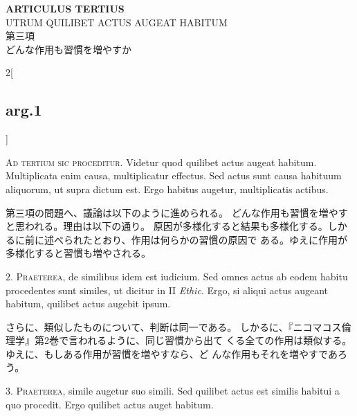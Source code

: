 \documentclass[paper=a4paper,fontsize=10pt,jafontsize=9pt,titlepage]{jlreq}
\begin{document}
\begin{center}
{\Large {\bfseries ARTICULUS TERTIUS}}\\
{\large UTRUM QUILIBET ACTUS AUGEAT HABITUM}\\
{\Large 第三項\\どんな作用も習慣を増やすか}
\end{center}

\begin{paracol}{2}[\subsection{arg.1}]

{\scshape Ad tertium sic proceditur}. Videtur quod quilibet actus augeat
habitum. Multiplicata enim causa, multiplicatur effectus. Sed actus
sunt causa habituum aliquorum, ut supra dictum est. Ergo habitus
augetur, multiplicatis actibus.

\switchcolumn

第三項の問題へ、議論は以下のように進められる。
どんな作用も習慣を増やすと思われる。理由は以下の通り。
原因が多様化すると結果も多様化する。しかるに前に述べられたとおり、作用は何らかの習慣の原因で
 ある。ゆえに作用が多様化すると習慣も増やされる。


2. {\scshape Praeterea}, de similibus idem est iudicium. Sed omnes actus ab eodem
habitu procedentes sunt similes, ut dicitur in II {\itshape Ethic}. Ergo, si
aliqui actus augeant habitum, quilibet actus augebit ipsum.

\switchcolumn

さらに、類似したものについて、判断は同一である。
しかるに、『ニコマコス倫理学』第2巻で言われるように、同じ習慣から出て
 くる全ての作用は類似する。ゆえに、もしある作用が習慣を増やすなら、ど
 んな作用もそれを増やすであろう。


3. {\scshape Praeterea}, simile augetur suo simili. Sed quilibet actus est similis
habitui a quo procedit. Ergo quilibet actus auget habitum.

\switchcolumn


\end{paracol}
\end{document}
